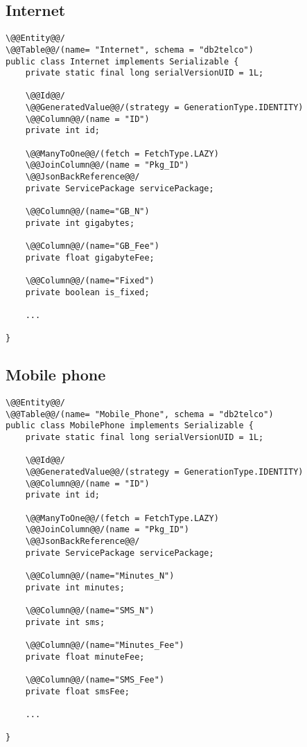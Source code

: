 \subsection*{Internet}

\begin{lstlisting}[style = JPA]
\@@Entity@@/
\@@Table@@/(name= "Internet", schema = "db2telco")
public class Internet implements Serializable {
    private static final long serialVersionUID = 1L;

    \@@Id@@/
    \@@GeneratedValue@@/(strategy = GenerationType.IDENTITY)
    \@@Column@@/(name = "ID")
    private int id;

    \@@ManyToOne@@/(fetch = FetchType.LAZY)
    \@@JoinColumn@@/(name = "Pkg_ID")
    \@@JsonBackReference@@/
    private ServicePackage servicePackage;

    \@@Column@@/(name="GB_N")
    private int gigabytes;

    \@@Column@@/(name="GB_Fee")
    private float gigabyteFee;

    \@@Column@@/(name="Fixed")
    private boolean is_fixed;
    
    ...

}
\end{lstlisting}

\subsection*{Mobile phone}

\begin{lstlisting}[style = JPA]
\@@Entity@@/
\@@Table@@/(name= "Mobile_Phone", schema = "db2telco")
public class MobilePhone implements Serializable {
    private static final long serialVersionUID = 1L;

    \@@Id@@/
    \@@GeneratedValue@@/(strategy = GenerationType.IDENTITY)
    \@@Column@@/(name = "ID")
    private int id;

    \@@ManyToOne@@/(fetch = FetchType.LAZY)
    \@@JoinColumn@@/(name = "Pkg_ID")
    \@@JsonBackReference@@/
    private ServicePackage servicePackage;

    \@@Column@@/(name="Minutes_N")
    private int minutes;

    \@@Column@@/(name="SMS_N")
    private int sms;

    \@@Column@@/(name="Minutes_Fee")
    private float minuteFee;

    \@@Column@@/(name="SMS_Fee")
    private float smsFee;
    
    ...

}
\end{lstlisting}

